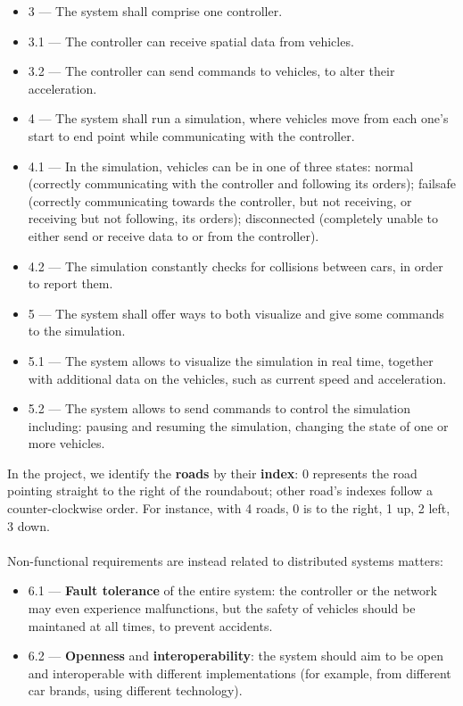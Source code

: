\begin{itemize}
  others nearby (in reality, it could be implemented through infra-red, for
  example).
  \item 3 --- The system shall comprise one controller.
  \item 3.1 --- The controller can receive spatial data from vehicles.
  \item 3.2 --- The controller can send commands to vehicles, to alter their
  acceleration.
  \item 4 --- The system shall run a simulation, where vehicles move from each
  one's start to end point while communicating with the controller.
  \item 4.1 --- In the simulation, vehicles can be in one of three states: normal
  (correctly communicating with the controller and following its orders);
  failsafe (correctly communicating towards the controller, but not receiving, or
  receiving but not following, its orders); disconnected (completely unable to
  either send or receive data to or from the controller).
  \item 4.2 --- The simulation constantly checks for collisions between cars, in
  order to report them.
  \item 5 --- The system shall offer ways to both visualize and give some
  commands to the simulation.
  \item 5.1 --- The system allows to visualize the simulation in real time,
  together with additional data on the vehicles, such as current speed and
  acceleration.
  \item 5.2 --- The system allows to send commands to control the simulation
  including: pausing and resuming the simulation, changing the state of one or
  more vehicles.
\end{itemize}

In the project, we identify the \textbf{roads} by their \textbf{index}: 0
represents the road pointing straight to the right of the roundabout; other
road's indexes follow a counter-clockwise order. For instance, with 4 roads, 0
is to the right, 1 up, 2 left, 3 down.
\\
\\
Non-functional requirements are instead related to distributed systems matters:

\begin{itemize}
  \item 6.1\label{req:req_fault} --- \textbf{Fault tolerance} of the entire
  system: the controller or the network may even experience malfunctions, but
  the safety of vehicles should be maintaned at all times, to prevent accidents.
  \item\label{req:req_openness} 6.2 --- \textbf{Openness} and
  \textbf{interoperability}: the system should aim to be open and interoperable
  with different implementations (for example, from different car brands, using
  different technology).
\end{itemize}

